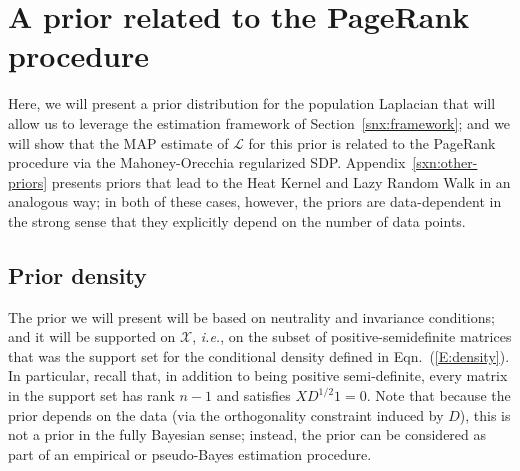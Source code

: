 \documentclass[12pt]{article}
\theoremstyle{plain}
\begin{document}
\vspace{-2mm}
\section{A prior related to the PageRank procedure}
\label{sxn:priors}
\vspace{-1mm}



Here, we will present a prior distribution for the population Laplacian 
that will allow us to leverage the estimation framework of 
Section~\ref{snx:framework}; and we will show that the MAP estimate 
of $\mathcal{L}$ for this prior is related to the PageRank procedure via 
the Mahoney-Orecchia regularized SDP.  
Appendix~\ref{sxn:other-priors} presents priors that lead to the Heat 
Kernel and Lazy Random Walk in an analogous way; in both of these cases, 
however, the priors are data-dependent in the strong sense that they 
explicitly depend on the number of data points.



\vspace{-2mm}
\subsection{Prior density}

The prior we will present will be based on neutrality and invariance 
conditions; and it will be supported on $\mathcal{X}$, \emph{i.e.}, on the 
subset of positive-semidefinite matrices that was the support set for the 
conditional density defined in Eqn.~(\ref{E:density}).
In particular, recall that, in addition to being positive semi-definite, 
every matrix in the support set has rank $n - 1$ and satisfies 
$X D^{1/2} 1 = 0$.  
Note that because the prior depends on the data (via the orthogonality 
constraint induced by $D$), this is not a prior in the fully Bayesian 
sense; instead, the prior can be considered as part of an empirical or 
pseudo-Bayes estimation procedure.
\end{document}
